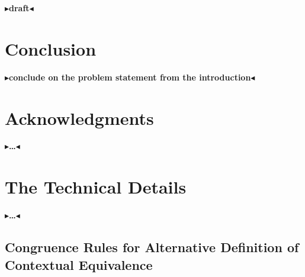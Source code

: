 \documentclass[twoside,11pt,openright]{report}
\theoremstyle{definition}
\newcommand{\todo}[1]{{\color[rgb]{.5,0,0}\textbf{$\blacktriangleright$#1$\blacktriangleleft$}}}
\begin{document}
\todo{draft}



\chapter{Conclusion}
\label{ch:conclusion}

\todo{conclude on the problem statement from the introduction}

\chapter*{Acknowledgments}

\todo{\dots}


\cleardoublepage
{}
 



\cleardoublepage
\appendix
\chapter{The Technical Details}

\todo{\dots}

\section{Congruence Rules for Alternative Definition of Contextual Equivalence}\label{appendix:Cng}
\end{document}
